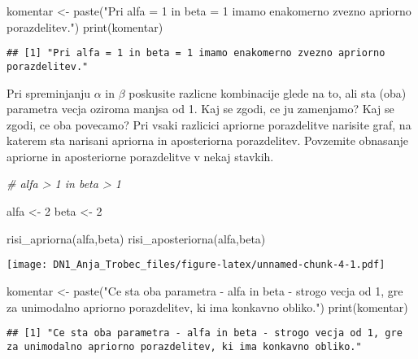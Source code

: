 \documentclass[
]{article}
\newenvironment{Shaded}{\begin{snugshade}}{\end{snugshade}}
\newcommand{\CommentTok}[1]{\textcolor[rgb]{0.56,0.35,0.01}{\textit{#1}}}
\newcommand{\DecValTok}[1]{\textcolor[rgb]{0.00,0.00,0.81}{#1}}
\newcommand{\FunctionTok}[1]{\textcolor[rgb]{0.00,0.00,0.00}{#1}}
\newcommand{\NormalTok}[1]{#1}
\newcommand{\OtherTok}[1]{\textcolor[rgb]{0.56,0.35,0.01}{#1}}
\newcommand{\StringTok}[1]{\textcolor[rgb]{0.31,0.60,0.02}{#1}}
\begin{document}
\begin{Shaded}
\begin{Highlighting}[]
\NormalTok{komentar }\OtherTok{\textless{}{-}} \FunctionTok{paste}\NormalTok{(}\StringTok{"Pri alfa = 1 in beta = 1 imamo enakomerno zvezno apriorno porazdelitev."}\NormalTok{)}
\FunctionTok{print}\NormalTok{(komentar)}
\end{Highlighting}
\end{Shaded}

\begin{verbatim}
## [1] "Pri alfa = 1 in beta = 1 imamo enakomerno zvezno apriorno porazdelitev."
\end{verbatim}

Pri spreminjanju \(\alpha\) in \(\beta\) poskusite razlicne kombinacije
glede na to, ali sta (oba) parametra vecja oziroma manjsa od 1. Kaj se
zgodi, ce ju zamenjamo? Kaj se zgodi, ce oba povecamo? Pri vsaki
razlicici apriorne porazdelitve narisite graf, na katerem sta narisani
apriorna in aposteriorna porazdelitev. Povzemite obnasanje apriorne in
aposteriorne porazdelitve v nekaj stavkih.

\begin{Shaded}
\begin{Highlighting}[]
\CommentTok{\# alfa \textgreater{} 1 in beta \textgreater{} 1}

\NormalTok{alfa }\OtherTok{\textless{}{-}} \DecValTok{2}
\NormalTok{beta }\OtherTok{\textless{}{-}} \DecValTok{2}

\FunctionTok{risi\_apriorna}\NormalTok{(alfa,beta)}
\FunctionTok{risi\_aposteriorna}\NormalTok{(alfa,beta)}
\end{Highlighting}
\end{Shaded}

\texttt{[image: DN1\_Anja\_Trobec\_files/figure-latex/unnamed-chunk-4-1.pdf]}

\begin{Shaded}
\begin{Highlighting}[]
\NormalTok{komentar }\OtherTok{\textless{}{-}} \FunctionTok{paste}\NormalTok{(}\StringTok{"Ce sta oba parametra {-} alfa in beta {-} strogo vecja od 1, gre za unimodalno apriorno porazdelitev, ki ima konkavno obliko."}\NormalTok{)}
\FunctionTok{print}\NormalTok{(komentar)}
\end{Highlighting}
\end{Shaded}

\begin{verbatim}
## [1] "Ce sta oba parametra - alfa in beta - strogo vecja od 1, gre za unimodalno apriorno porazdelitev, ki ima konkavno obliko."
\end{verbatim}
\end{document}
